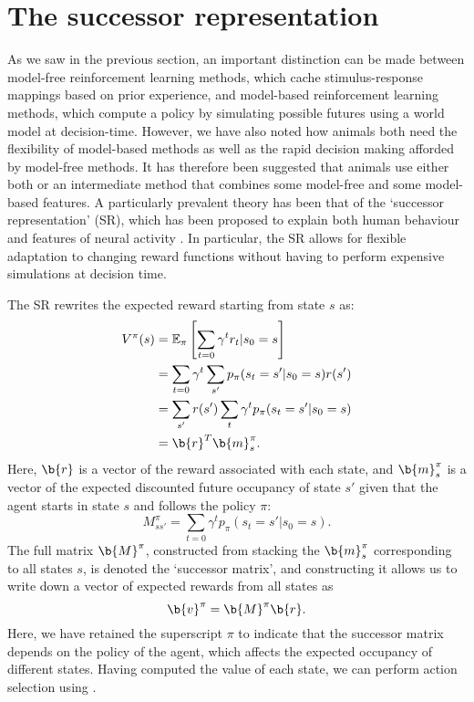 \section{The successor representation}
\label{sec:SR}

As we saw in the previous section, an important distinction can be made between model-free reinforcement learning methods, which cache stimulus-response mappings based on prior experience, and model-based reinforcement learning methods, which compute a policy by simulating possible futures using a world model at decision-time.
However, we have also noted how animals both need the flexibility of model-based methods as well as the rapid decision making afforded by model-free methods.
It has therefore been suggested that animals use either both or an intermediate method that combines some model-free and some model-based features.
A particularly prevalent theory has been that of the `successor representation' (SR), which has been proposed to explain both human behaviour \citep{momennejad2017successor} and features of neural activity \citep{stachenfeld2017hippocampus}.
In particular, the SR allows for flexible adaptation to changing reward functions without having to perform expensive simulations at decision time.

The SR \citep{dayan1993improving} rewrites the expected reward starting from state $s$ as:
\begin{align}
    V^\pi(s) &= \mathbb{E}_\pi \left [ \sum_{t = 0} \gamma^t r_t | s_0 = s\right ] \\
    &= \sum_{t = 0} \gamma^t \sum_{s'} p_\pi(s_t = s' | s_0 = s) r(s')\\
    &= \sum_{s'} r(s') \sum_t \gamma^t p_\pi(s_t = s' | s_0 = s)\\
    &= \b{r}^T \b{m}^\pi_s.
\end{align}
Here, $\b{r}$ is a vector of the reward associated with each state, and $\b{m}^\pi_s$ is a vector of the expected discounted future occupancy of state $s'$ given that the agent starts in state $s$ and follows the policy $\pi$:
\begin{equation}
    M^\pi_{s s'} = \sum_{t = 0} \gamma^t p_\pi(s_t = s' | s_0 = s).
\end{equation}
The full matrix $\b{M}^\pi$, constructed from stacking the $\b{m}^\pi_s$ corresponding to all states $s$, is denoted the `successor matrix', and constructing it allows us to write down a vector of expected rewards from all states as
\begin{equation}
    \b{v}^\pi = \b{M}^\pi \b{r}.
\end{equation}
Here, we have retained the superscript $\pi$ to indicate that the successor matrix depends on the policy of the agent, which affects the expected occupancy of different states.
Having computed the value of each state, we can perform action selection using .

